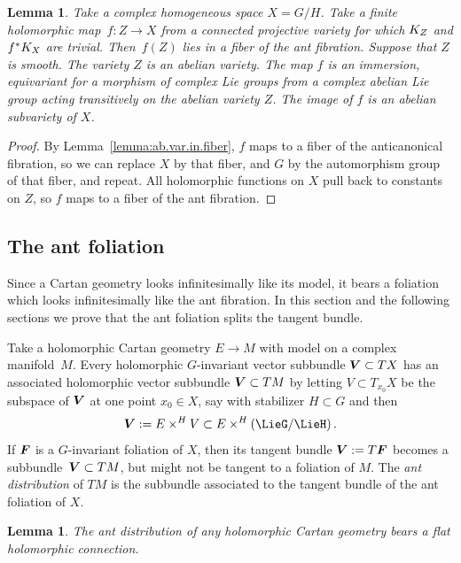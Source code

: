 \documentclass[11pt]{article}
\numberwithin{equation}{section}
\numberwithin{equation}{section}
\newtheorem{Lemma}[Theorem]{Lemma}
\begin{document}
\begin{Lemma}\label{lemma:ab.var.in.fiber.2}
Take a complex homogeneous space $X = G/H$.
Take a finite holomorphic map~${f \colon Z \to X}$ from a connected projective variety for which $\cb{Z}$ and $f^*\cb{X}$ are trivial.
Then~$f(Z)$ lies in a fiber of the ant fibration.
Suppose that $Z$ is smooth.
The variety $Z$ is an abelian variety.
The map $f$ is an immersion, equivariant for a morphism of complex Lie groups from a complex abelian Lie group acting transitively on the abelian variety $Z$.
The image of $f$ is an abelian subvariety of $X$.
\end{Lemma}

\begin{proof}
By Lemma~\ref{lemma:ab.var.in.fiber}, $f$ maps to a fiber of the anticanonical fibration, so we can replace $X$ by that fiber, and $G$ by the automorphism group of that fiber, and repeat.
All holomorphic functions on $X$ pull back to constants on $Z$, so $f$ maps to a fiber of the ant fibration.
\end{proof}

\subsection{The ant foliation}
Since a Cartan geometry looks infinitesimally like its model, it bears a foliation which looks infinitesimally like the ant fibration.
In this section and the following sections we prove that the ant foliation splits the tangent bundle.

Take a holomorphic Cartan geometry $E \to M$ with model  on a complex manifold~$M$.
Every holomorphic $G$-invariant vector subbundle ${\bm{V}} \subset TX$ has an associated
holomorphic vector subbundle ${\bm{V}} \subset TM$ by letting $V \subset T_{x_0} X$ be the
subspace of ${\bm{V}}$ at one point $x_0 \in X$, say with stabilizer $H \subset G$ and then
\[
\vb{V} := E \times^H V \subset E \times^H \pr{\LieG/\LieH}.
\]
If ${\bm{F}}$ is a $G$-invariant foliation of $X$, then its tangent bundle ${\bm{V}} := T{\bm{F}}$
becomes a subbundle~${{\bm{V}} \subset TM}$, but might not be tangent to a foliation of $M$.
The \emph{ant distribution} of $TM$ is the subbundle associated to the tangent bundle of the ant
foliation of $X$.

\begin{Lemma}
The ant distribution of any holomorphic Cartan geometry bears a flat holomorphic connection.
\end{Lemma}
\end{document}
